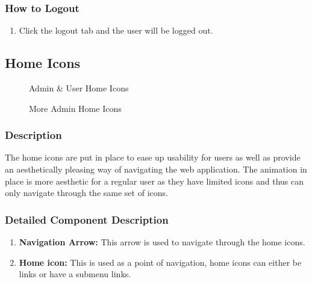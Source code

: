\documentclass[14pt, a4paper]{article}
\begin{document}
\subsubsection{How to Logout}
\begin{enumerate}
\item Click the logout tab and the user will be logged out.
\end{enumerate}
\subsection{Home Icons}
\begin{figure}[H]
\caption{Admin \& User Home Icons}
\label{fig:icons1}
\end{figure}
\begin{figure}[H]
\caption{More Admin Home Icons}
\label{fig:icons2}
\end{figure}
\subsubsection{Description} The home icons are put in place to ease up usability for users as well as provide an aesthetically pleasing way of navigating the web application. The animation in place is more aesthetic for a regular user as they have limited icons and thus can only navigate through the same set of icons.
\subsubsection{Detailed Component Description}
\begin{enumerate}
\item \textbf{Navigation Arrow:} This arrow is used to navigate through the home icons.
\item \textbf{Home icon:} This is used as a point of navigation, home icons can either be links or have a submenu links.
\end{enumerate}
\end{document}

